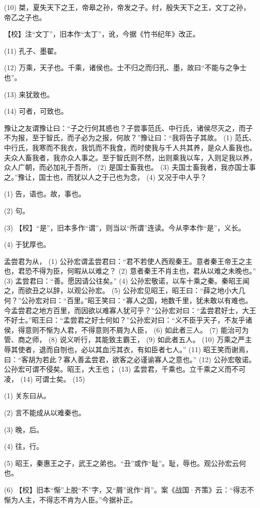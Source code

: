 \documentclass[12pt,UTF8]{ctexbook}
\begin{document}
(10) 桀，夏失天下之王，帝皋之孙，帝发之子。纣，殷失天下之王，文丁之孙，帝乙之子也。

【校】注“文丁”，旧本作“太丁”，讹，今据《竹书纪年》改正。

(11) 孔子、墨翟。

(12) 万乘，天子也。千乘，诸侯也。士不归之而归孔、墨，故曰“不能与之争士也”。

(13) 来犹致也。

(14) 可者，可致也。

豫让之友谓豫让曰：“子之行何其惑也？子尝事范氏、中行氏，诸侯尽灭之，而子不为报，至于智氏，而子必为之报，何故？”豫让曰：“我将告子其故。 (1) 范氏、中行氏，我寒而不我衣，我饥而不我食，而时使我与千人共其养，是众人畜我也。夫众人畜我者，我亦众人事之。至于智氏则不然，出则乘我以车，入则足我以养，众人广朝，而必加礼于吾所， (2) 是国士畜我也。 (3) 夫国士畜我者，我亦国士事之。”豫让，国士也，而犹以人之于己也为念， (4) 又况于中人乎？

(1) 告，语也。故，事也。

(2) 句。

(3) 【校】“是”，旧本多作“谓”，则当以“所谓”连读。今从李本作“是”，义长。

(4) 于犹厚也。

孟尝君为从， (1) 公孙宏谓孟尝君曰：“君不若使人西观秦王。意者秦王帝王之主也，君恐不得为臣，何暇从以难之？ (2) 意者秦王不肖主也，君从以难之未晚也。” (3) 孟尝君曰：“善。愿因请公往矣。” (4) 公孙宏敬诺，以车十乘之秦。秦昭王闻之，而欲丑之以辞，以观公孙宏。 (5) 公孙宏见昭王，昭王曰：“薛之地小大几何？”公孙宏对曰：“百里。”昭王笑曰：“寡人之国，地数千里，犹未敢以有难也。今孟尝君之地方百里，而因欲以难寡人犹可乎？”公孙宏对曰：“孟尝君好士，大王不好士。”昭王曰：“孟尝君之好士何如？”公孙宏对曰：“义不臣乎天子，不友乎诸侯，得意则不惭为人君，不得意则不屑为人臣， (6) 如此者三人。 (7) 能治可为管、商之师， (8) 说义听行，其能致主霸王， (9) 如此者五人。 (10) 万乘之严主辱其使者，退而自刎也，必以其血污其衣，有如臣者七人。” (11) 昭王笑而谢焉，曰：“客胡为若此？寡人善孟尝君，欲客之必谨谕寡人之意也。” (12) 公孙宏敬诺。公孙宏可谓不侵矣。昭王，大王也； (13) 孟尝君，千乘也。立千乘之义而不可凌， (14) 可谓士矣。 (15)

(1) 关东曰从。

(2) 言不能成从以难秦也。

(3) 晚，后。

(4) 往，行。

(5) 昭王，秦惠王之子，武王之弟也。“丑”或作“耻”。耻，辱也。观公孙宏云何也。

(6) 【校】旧本“惭”上脱“不”字，又“屑”讹作“肖”。案《战国·齐策》云：“得志不惭为人主，不得志不肯为人臣。”今据补正。
\end{document}

